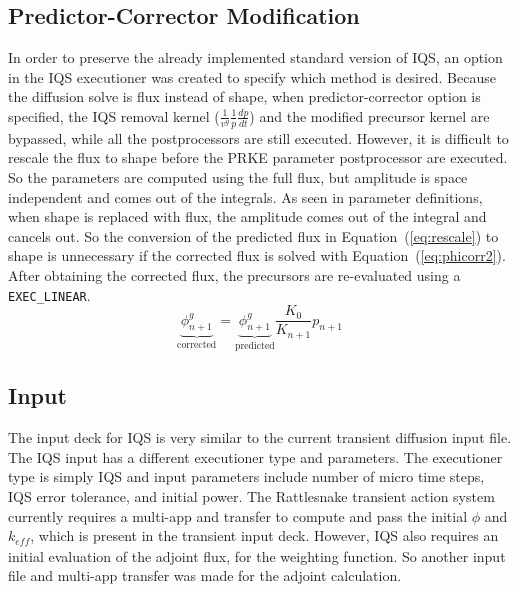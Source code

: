 \documentclass[12pt]{scrartcl}
\newcommand{\eqt}[1]{Equation~(\ref{#1})}                     %
\newcommand{\keff}{k_\textit{eff}}
\newcommand{\be}{\begin{equation}}
\newcommand{\ee}{\end{equation}}
\begin{document}
\subsection{Predictor-Corrector Modification}

In order to preserve the already implemented standard version of IQS, an option in the IQS executioner was created to specify which method is desired.  Because the diffusion solve is flux instead of shape, when predictor-corrector option is specified, the IQS removal kernel ($\frac{1}{v^g}\frac{1}{p}\frac{dp}{dt}$) and the modified precursor kernel are bypassed, while all the postprocessors are still executed.  However, it is difficult to rescale the flux to shape before the PRKE parameter postprocessor are executed.  So the parameters are computed using the full flux, but amplitude is space independent and comes out of the integrals.  As seen in parameter definitions, when shape is replaced with flux, the amplitude comes out of the integral and cancels out.  So the conversion of the predicted flux in  \eqt{eq:rescale} to shape is unnecessary if the corrected flux is solved with \eqt{eq:phicorr2}.  After obtaining the corrected flux, the precursors are re-evaluated using a \texttt{EXEC\_LINEAR}.
\be
\underbrace{\phi^g_{n+1}}_{\text{corrected}} = \underbrace{\phi^g_{n+1}}_{\text{predicted}} \frac{K_0}{K_{n+1}} p_{n+1}
\label{eq:phicorr2}
\ee

\subsection{Input}

The input deck for IQS is very similar to the current transient diffusion input file.  The IQS input has a different executioner type and parameters.  The executioner type is simply IQS and input parameters include number of micro time steps, IQS error tolerance, and initial power.  The Rattlesnake transient action system currently requires a multi-app and transfer to compute and pass the initial $\phi$ and $\keff$, which is present in the transient input deck.  However, IQS also requires an initial evaluation of the adjoint flux, for the weighting function.  So another input file and multi-app transfer was made for the adjoint calculation.  \\
\end{document}
